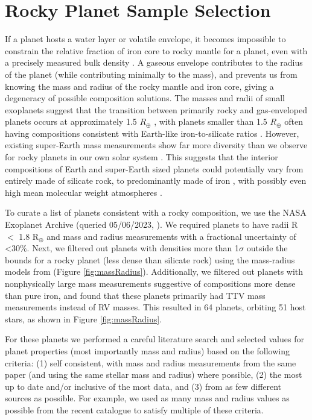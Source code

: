 \documentclass[twocolumn]{aastex631}
\begin{document}
\section{Rocky Planet Sample Selection} 
\label{sec:sample}
If a planet hosts a water layer or volatile envelope, it becomes impossible to constrain the relative fraction of iron core to rocky mantle for a planet, even with a precisely measured bulk density \citep{Valencia2007, RogersSeager2010}. A gaseous envelope contributes to the radius of the planet (while contributing minimally to the mass), and prevents us from knowing the mass and radius of the rocky mantle and iron core, giving a degeneracy of possible composition solutions. The masses and radii of small exoplanets suggest that the transition between primarily rocky and gas-enveloped planets occurs at approximately 1.5 $R_{\oplus}$ \citep{2014ApJ...783L...6W, 2015ApJ...801...41R, 2017AJ....154..109F}, with planets smaller than 1.5 $R_{\oplus}$ often having compositions consistent with Earth-like iron-to-silicate ratios \citep{2015ApJ...800..135D}. However, existing super-Earth mass measurements show far more diversity than we observe for rocky planets in our own solar system \citep{2014ApJS..210...20M, 2016ApJ...822...86M, 2019ApJ...883...79D}. This suggests that the interior compositions of Earth and super-Earth sized planets could potentially vary from entirely made of silicate rock, to predominantly made of iron \citep{2019NatAs...3..416B}, with possibly even high mean molecular weight atmospheres \citep{2017AJ....154..232A, 2021ApJ...909L..22K}. 

To curate a list of planets consistent with a rocky composition, we use the NASA Exoplanet Archive (queried 05/06/2023, \citealt{2013PASP..125..989A}). We required planets to have radii R $<$ 1.8 R$_{\oplus}$ and mass and radius measurements with a fractional uncertainty of <30$\%$. Next, we filtered out planets with densities more than 1$\sigma$ outside the bounds for a rocky planet (less dense than silicate rock) using the mass-radius models from \cite{Zeng2019} (Figure \ref{fig:massRadius}). Additionally, we filtered out planets with nonphysically large mass measurements suggestive of compositions more dense than pure iron, and found that these planets primarily had TTV mass measurements instead of RV masses. This resulted in 64 planets, orbiting 51 host stars, as shown in Figure \ref{fig:massRadius}. 

For these planets we performed a careful literature search and selected values for planet properties (most importantly mass and radius) based on the following criteria: (1) self consistent, with mass and radius measurements from the same paper (and using the same stellar mass and radius) where possible, (2) the most up to date and/or inclusive of the most data, and (3) from as few different sources as possible. For example, we used as many mass and radius values as possible from the recent  \cite{2023A&A...677A..33B} catalogue to satisfy multiple of these criteria. 
\end{document}
